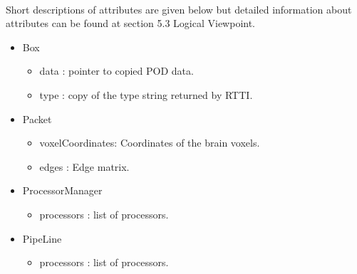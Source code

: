 \paragraph{}
\normalsize
Short descriptions of attributes are given below but detailed information about attributes can be found at section 5.3 Logical Viewpoint.
\begin{itemize}
\item	Box
 
  \begin{itemize}
  	\item	data : pointer to copied POD data.
    \item	type : copy of the type string returned by RTTI.
  \end{itemize}

\item    Packet
 \begin{itemize}
  	\item	voxelCoordinates: Coordinates of the brain voxels.
    \item	edges : Edge matrix.
  \end{itemize}

\item    ProcessorManager
\begin{itemize}
  	\item	processors : list of processors.
  \end{itemize}	
\item  	PipeLine
\begin{itemize}
  	\item	processors : list of processors.
  \end{itemize}
\end{itemize}


\skipsubsection


